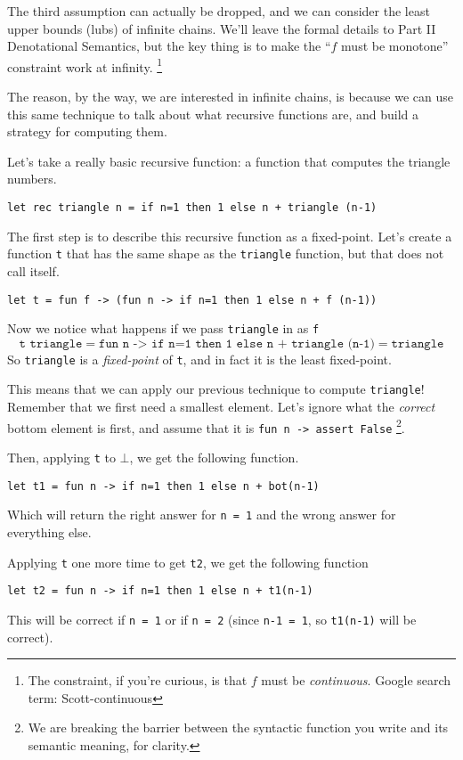 The third assumption can actually be dropped, and we can consider the least upper bounds (lubs) of infinite chains. We'll leave the formal details to \textsf{Part II Denotational Semantics}, but the key thing is to make the ``$f$ must be monotone'' constraint work at infinity. \footnote{The constraint, if you're curious, is that $f$ must be \textit{continuous}. Google search term: Scott-continuous}

The reason, by the way, we are interested in infinite chains, is because we can use this same technique to talk about what recursive functions are, and build a strategy for computing them. 

Let's take a really basic recursive function: a function that computes the triangle numbers. 
\begin{verbatim}
let rec triangle n = if n=1 then 1 else n + triangle (n-1)
\end{verbatim}
The first step is to describe this recursive function as a fixed-point. Let's create a function \texttt{t} that has the same shape as the \texttt{triangle} function, but that does not call itself.
\begin{verbatim}
let t = fun f -> (fun n -> if n=1 then 1 else n + f (n-1))
\end{verbatim}
Now we notice what happens if we pass \texttt{triangle} in as \texttt{f}
\[\texttt{t triangle} = \texttt{fun n -> if n=1 then 1 else n + triangle (n-1)} = \texttt{triangle}\]
So \texttt{triangle} is a \textit{fixed-point} of \texttt{t}, and in fact it is the least fixed-point.

This means that we can apply our previous technique to compute \texttt{triangle}! Remember that we first need a smallest element. Let's ignore what the \textit{correct} bottom element is first, and assume that it is \texttt{fun n -> assert False} \footnote{We are breaking the barrier between the syntactic function you write and its semantic meaning, for clarity.}.

Then, applying \texttt{t} to $\bot$, we get the following function. 
\begin{verbatim}
let t1 = fun n -> if n=1 then 1 else n + bot(n-1)
\end{verbatim}
Which will return the right answer for \texttt{n = 1} and the wrong answer for everything else.

Applying \texttt{t} one more time to get \texttt{t2}, we get the following function
\begin{verbatim}
let t2 = fun n -> if n=1 then 1 else n + t1(n-1)
\end{verbatim}
This will be correct if \texttt{n = 1} or if \texttt{n = 2} (since \texttt{n-1 = 1}, so \texttt{t1(n-1)} will be correct). 

